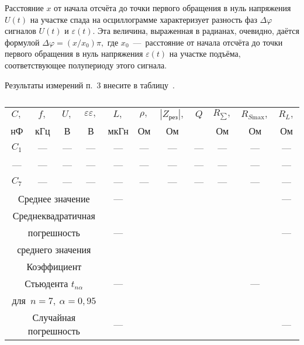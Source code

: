 \begin{lab:task}
    Расстояние $x$ от начала отсчёта до точки первого обращения в нуль
напряжения $U(t)$ на участке спада на осциллограмме характеризует разность фаз
$\Delta\varphi$ сигналов $U(t)$ и $\varepsilon(t).$ Эта величина, выраженная в
радианах, очевидно, даётся формулой $\Delta\varphi=(x/x_0)\pi,$ где
$x_0$~---~расстояние от начала отсчёта до точки первого обращения в нуль
напряжения $\varepsilon(t)$ на участке подъёма, соответствующее полупериоду
этого сигнала.


	\item Результаты измерений п.~3 внесите в таблицу~.
	\begin{center}
	    \begin{table}[h!]
	        \caption{}
	        \begin{center}
	            \begin{tabular}{|c|c|c|c|c|c|c|c|c|c|c|}
	                \hline
	                $C,$ & $f,$ & $U,$ & $\varepsilon\varepsilon,$ & $L,$ &
$\rho,$ & $|Z_{\text{рез}}|,$& $Q$ & $R_{\scriptscriptstyle \sum},$ & $R_{S
\text{max}},$& $R_L,$\\

	                нФ & кГц & В & В & мкГн & Ом & Ом &  & Ом & Ом & Ом \\
	                \hline
	                $C_1$ & {---} & --- & --- & --- & --- & --- & --- & --- &
--- & --- \\
	                \hline
	                --- & --- & --- & --- & --- & --- & --- & --- & --- & ---&
---\\
	                \hline
	                $C_7$& --- & --- & --- & --- & --- & --- & ---& --- &---
&---\\
	                \hline
	                \multicolumn{4}{|c|}{ Среднее значение} & --- & & & & & &---
\\
	                \hline
	                \multicolumn{4}{|c|}{ Среднеквадратичная } & & & & & & & \\
	                \multicolumn{4}{|c|}{ погрешность } & ---& & & & & &--- \\
	                \multicolumn{4}{|c|}{ среднего значения } &  & & & & && \\
	                \hline
	                \multicolumn{4}{|c|}{ Коэффициент } & & & & & & & \\
	                \multicolumn{4}{|c|}{ Стьюдента $t_{n\alpha}$ } & ---& & & &
&---& \\
	                \multicolumn{4}{|c|}{для~$n=7,~\alpha=0,95$} &  & & & & &&
\\
			                    \hline
	                \multicolumn{4}{|c|}{ Случайная погрешность } & ---& & & & &
&---\\


\end{tabular}
\end{center}
\end{table}
\end{center}
\end{lab:task}
